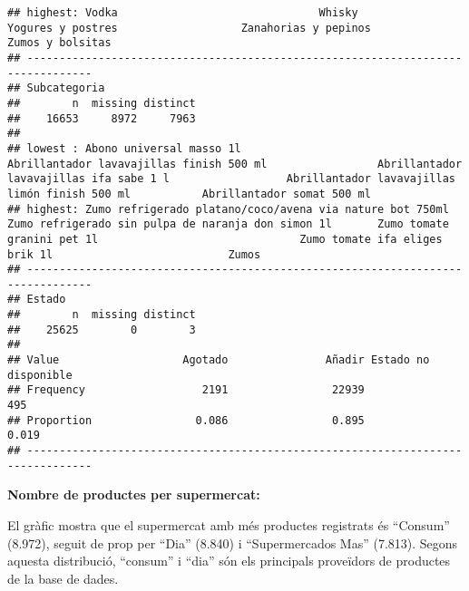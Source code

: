 \documentclass[
]{article}
\begin{document}
\begin{verbatim}
## highest: Vodka                               Whisky                              Yogures y postres                   Zanahorias y pepinos                Zumos y bolsitas                   
## --------------------------------------------------------------------------------
## Subcategoria 
##        n  missing distinct 
##    16653     8972     7963 
## 
## lowest : Abono universal masso 1l                                 Abrillantador lavavajillas finish 500 ml                 Abrillantador lavavajillas ifa sabe 1 l                  Abrillantador lavavajillas limón finish 500 ml           Abrillantador somat 500 ml                              
## highest: Zumo refrigerado platano/coco/avena via nature bot 750ml Zumo refrigerado sin pulpa de naranja don simon 1l       Zumo tomate granini pet 1l                               Zumo tomate ifa eliges brik 1l                           Zumos                                                   
## --------------------------------------------------------------------------------
## Estado 
##        n  missing distinct 
##    25625        0        3 
##                                                                          
## Value                   Agotado               Añadir Estado no disponible
## Frequency                  2191                22939                  495
## Proportion                0.086                0.895                0.019
## --------------------------------------------------------------------------------
\end{verbatim}

\textbf{Nombre de productes per supermercat:}

El gràfic mostra que el supermercat amb més productes registrats és
``Consum'' (8.972), seguit de prop per ``Dia'' (8.840) i ``Supermercados
Mas'' (7.813). Segons aquesta distribució, ``consum'' i ``dia'' són els
principals proveïdors de productes de la base de dades.
\end{document}
